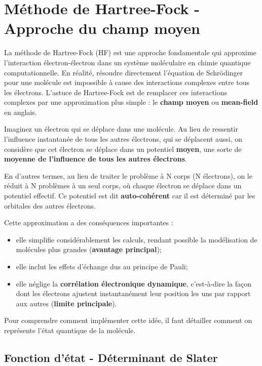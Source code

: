 \documentclass[12pt,a4paper]{article} %
\numberwithin{equation}{section} %
\numberwithin{figure}{section} %
\numberwithin{table}{section} %
\begin{document}
\section{Méthode de Hartree-Fock - Approche du champ moyen}

La méthode de Hartree-Fock (HF) est une approche fondamentale qui approxime l'interaction électron-électron dans un système moléculaire en chimie quantique computationnelle. En réalité, résoudre directement l'équation de Schrödinger pour une molécule est impossible à cause des interactions complexes entre tous les électrons. L'astuce de Hartree-Fock est de remplacer ces interactions complexes par une approximation plus simple : le \textbf{champ moyen} ou \textbf{mean-field} en anglais.

Imaginez un électron qui se déplace dans une molécule. Au lieu de ressentir l'influence instantanée de tous les autres électrons, qui se déplacent aussi, on considère que cet électron se déplace dans un potentiel \textbf{moyen}, une sorte de \textbf{moyenne de l'influence de tous les autres électrons}.

En d'autres termes, au lieu de traiter le problème à N corps (N électrons), on le réduit à N problèmes à un seul corps, où chaque électron se déplace dans un potentiel effectif. Ce potentiel est dit \textbf{auto-cohérent} car il est déterminé par les orbitales des autres électrons.

Cette approximation a des conséquences importantes :
\begin{itemize}
    \item elle simplifie considérablement les calculs, rendant possible la modélisation de molécules plus grandes (\textbf{avantage principal});
    \item elle inclut les effets d'échange dus au principe de Pauli;
    \item elle néglige la \textbf{corrélation électronique dynamique}, c'est-à-dire la façon dont les électrons ajustent instantanément leur position les uns par rapport aux autres (\textbf{limite principale}).
\end{itemize}

Pour comprendre comment implémenter cette idée, il faut détailler comment on représente l'état quantique de la molécule.

\subsection{Fonction d'état - Déterminant de Slater}
\end{document}
